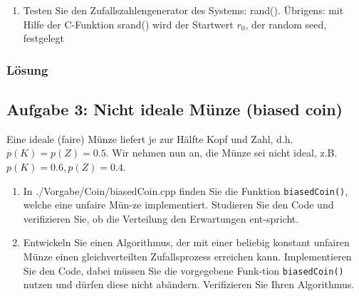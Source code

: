 \begin{enumerate}
\begin{center}
\begin{tabular}{c c c c}
            \hline
            \hline
       \end{tabular}
   \end{center}
\item Testen Sie den Zufallszahlengenerator des Systems: rand(). Übrigens: mit Hilfe der C-Funktion srand() wird der Startwert $r_0$, der random seed, festgelegt

\end{enumerate}

\subsubsection{Lösung}


\noindent\makebox[\linewidth]{\rule{\paperwidth}{0.4pt}}

\noindent\makebox[\linewidth]{\rule{\paperwidth}{0.4pt}}

\noindent\makebox[\linewidth]{\rule{\paperwidth}{0.4pt}}

\noindent\makebox[\linewidth]{\rule{\paperwidth}{0.4pt}}


\subsection{Aufgabe 3: Nicht ideale Münze (biased coin)}
Eine ideale (faire) Münze liefert je zur Hälfte Kopf und Zahl, d.h. $p(K) = p(Z) = 0.5$. Wir nehmen nun an, die Münze sei nicht ideal, z.B.$ p(K) = 0.6, p(Z) = 0.4$.

\begin{enumerate}
  \item In ./Vorgabe/Coin/biasedCoin.cpp finden Sie die Funktion \texttt{biasedCoin()}, welche eine unfaire Mün-ze implementiert. Studieren Sie den Code und verifizieren Sie, ob die Verteilung den Erwartungen ent-spricht.
  \item Entwickeln Sie einen Algorithmus, der mit einer beliebig konstant unfairen Münze einen gleichverteilten Zufallsprozess erreichen kann. Implementieren Sie den Code, dabei müssen Sie die vorgegebene Funk-tion \texttt{biasedCoin()} nutzen und dürfen diese nicht abändern. Verifizieren Sie Ihren Algorithmus.
\end{enumerate}

